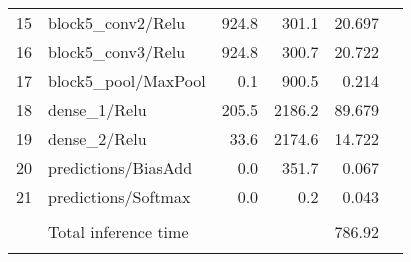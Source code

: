 \begin{tabular}{llrrrr}
\rowcolor{light-gray}	15 &  block5\_conv2/Relu                   		&   924.8  	&	 301.1 		& 20.697\\
\rowcolor{light-gray}	16 &  block5\_conv3/Relu                   		&   924.8  	&	 300.7 		& 20.722\\
\rowcolor{light-gray}	17 &  block5\_pool/MaxPool                 		&     0.1  	&	 900.5 		&  0.214\\
\rowcolor{light-gray}	18 &  dense\_1/Relu                        		&   205.5  	&	2186.2 		& 89.679\\
\rowcolor{light-gray}	19 &  dense\_2/Relu                        		&    33.6  	&	2174.6 		& 14.722\\
\rowcolor{light-gray}	20 &  predictions/BiasAdd                  		&    0.0   	&	351.7  		& 0.067\\
\rowcolor{light-gray}	21 &  predictions/Softmax                  		&    0.0   	&	  0.2  		& 0.043\\
\rowcolor{light-gray}	\multicolumn{5}{l}{----------------------------------------------------------------------}\\
\rowcolor{light-gray}	   &  Total inference time 						&  			&       		& 786.92\\
\rowcolor{light-gray}	\multicolumn{5}{l}{----------------------------------------------------------------------}\\
\end{tabular}
